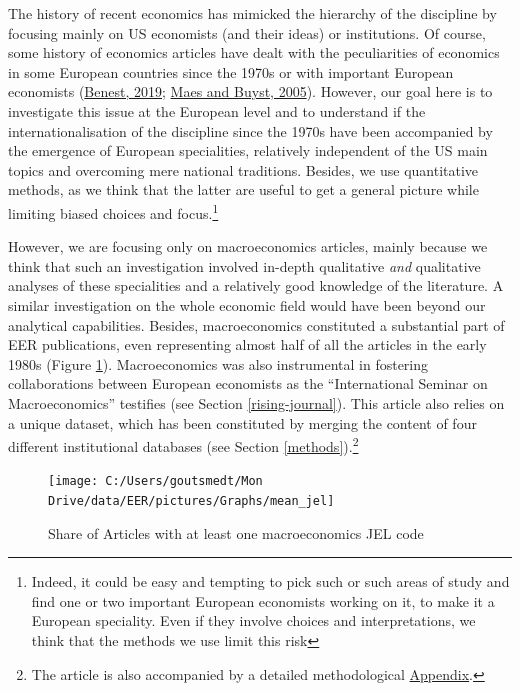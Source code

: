 \documentclass[]{elsarticle} %
\begin{document}
The history of recent economics has mimicked the hierarchy of the
discipline by focusing mainly on US economists (and their ideas) or
institutions. Of course, some history of economics articles have dealt
with the peculiarities of economics in some European countries since the
1970s or with important European economists
(\protect\hyperlink{ref-benest2019}{Benest, 2019};
\protect\hyperlink{ref-maes2005}{Maes and Buyst, 2005}). However, our
goal here is to investigate this issue at the European level and to
understand if the internationalisation of the discipline since the 1970s
have been accompanied by the emergence of European specialities,
relatively independent of the US main topics and overcoming mere
national traditions. Besides, we use quantitative methods, as we think
that the latter are useful to get a general picture while limiting
biased choices and focus.\footnote{Indeed, it could be easy and tempting
  to pick such or such areas of study and find one or two important
  European economists working on it, to make it a European speciality.
  Even if they involve choices and interpretations, we think that the
  methods we use limit this risk}

However, we are focusing only on macroeconomics articles, mainly because
we think that such an investigation involved in-depth qualitative
\emph{and} qualitative analyses of these specialities and a relatively
good knowledge of the literature. A similar investigation on the whole
economic field would have been beyond our analytical capabilities.
Besides, macroeconomics constituted a substantial part of EER
publications, even representing almost half of all the articles in the
early 1980s (Figure \ref{fig:plot-jel}). Macroeconomics was also
instrumental in fostering collaborations between European economists as
the ``International Seminar on Macroeconomics'' testifies (see Section
\ref{rising-journal}). This article also relies on a unique dataset,
which has been constituted by merging the content of four different
institutional databases (see Section \ref{methods}).\footnote{The
  article is also accompanied by a detailed methodological
  \protect\hyperlink{appendix}{Appendix}.}

\begin{figure}[h]

{\centering \texttt{[image: C:/Users/goutsmedt/Mon Drive/data/EER/pictures/Graphs/mean\_jel]} 

}

\caption{Share of Articles with at least one macroeconomics JEL code}\label{fig:plot-jel}
\end{figure}
\end{document}
